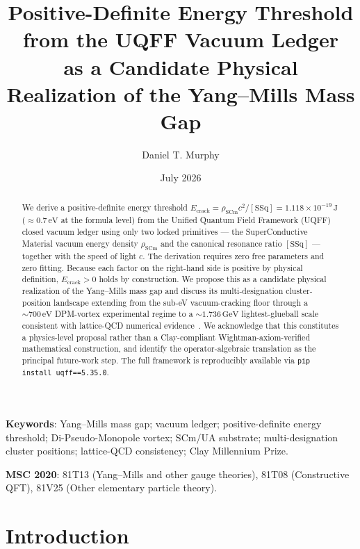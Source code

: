 \documentclass[11pt,a4paper,onecolumn]{article}
\title{
  Positive-Definite Energy Threshold from the UQFF Vacuum Ledger \\
  as a Candidate Physical Realization of the Yang--Mills Mass Gap
}
\author[1]{Daniel T. Murphy}
\affil[1]{
  Star-Magic Research Program, Youngstown, OH, USA \\
  \texttt{daniel.murphy00@enrgyone.com}
}
\date{July 2026}
\theoremstyle{plain}
\theoremstyle{definition}
\theoremstyle{remark}
\begin{document}
\maketitle

\begin{abstract}
We derive a positive-definite energy threshold
$E_{\text{crack}} = \rho_{\mathrm{SCm}} c^2 / [\mathrm{SSq}]
                  = 1.118 \times 10^{-19}\,\mathrm{J}$
($\approx 0.7\,\mathrm{eV}$ at the formula level)
from the Unified Quantum Field Framework (UQFF) closed vacuum ledger
using only two locked primitives --- the SuperConductive Material
vacuum energy density $\rho_{\mathrm{SCm}}$ and the canonical resonance
ratio $[\mathrm{SSq}]$ --- together with the speed of light $c$. The
derivation requires zero free parameters and zero fitting. Because
each factor on the right-hand side is positive by physical definition,
$E_{\text{crack}} > 0$ holds by construction. We propose this as a
candidate physical realization of the Yang--Mills mass gap and discuss
its multi-designation cluster-position landscape extending from the
sub-eV vacuum-cracking floor through a $\sim 700\,\mathrm{eV}$
DPM-vortex experimental regime to a $\sim 1.736\,\mathrm{GeV}$
lightest-glueball scale consistent with lattice-QCD numerical
evidence~\cite{douglas2026}. We acknowledge that this constitutes a
physics-level proposal rather than a Clay-compliant
Wightman-axiom-verified mathematical construction, and identify the
operator-algebraic translation as the principal future-work step.
The full framework is reproducibly available via
\verb|pip install uqff==5.35.0|.
\end{abstract}

\bigskip

\noindent
\textbf{Keywords}: Yang--Mills mass gap; vacuum ledger; positive-definite
energy threshold; Di-Pseudo-Monopole vortex; SCm/UA substrate;
multi-designation cluster positions; lattice-QCD consistency; Clay
Millennium Prize.

\medskip

\noindent
\textbf{MSC 2020}: 81T13 (Yang--Mills and other gauge theories), 81T08
(Constructive QFT), 81V25 (Other elementary particle theory).

\section{Introduction}\label{sec:intro}
\end{document}
